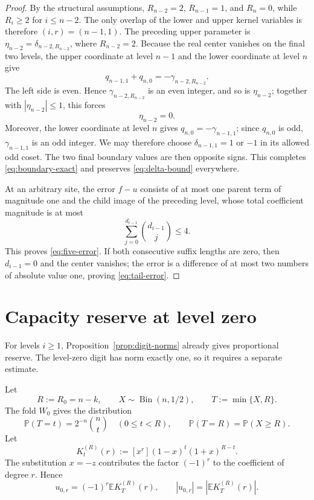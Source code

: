 \documentclass[11pt]{article}
\theoremstyle{definition}
\theoremstyle{remark}
\begin{document}
\begin{proof}
By the structural assumptions, $R_{n-2}=2$, $R_{n-1}=1$, and $R_n=0$,
while $R_i\ge2$ for $i\le n-2$. The only overlap of the
lower and upper kernel variables is therefore $(i,r)=(n-1,1)$.  The
preceding upper parameter is $\eta_{n-2}=\delta_{n-2,R_{n-2}}$, where
$R_{n-2}=2$.  Because the real center vanishes on the final two levels,
the upper coordinate at level $n-1$ and the lower coordinate at level $n$
give
\[
 q_{n-1,1}+q_{n,0}=-\gamma_{n-2,R_{n-2}}.
\]
The left side is even.  Hence $\gamma_{n-2,R_{n-2}}$ is an even integer, and so is $\eta_{n-2}$; together with $|\eta_{n-2}|\le1$, this forces
\[
 \eta_{n-2}=0.
\]
Moreover, the lower coordinate at level $n$ gives
$q_{n,0}=-\gamma_{n-1,1}$; since $q_{n,0}$ is odd,
$\gamma_{n-1,1}$ is an odd integer.  We may therefore choose
$\delta_{n-1,1}=1$ or $-1$ in its allowed odd coset.  The two final
boundary values are then opposite signs.  This completes
\eqref{eq:boundary-exact} and preserves \eqref{eq:delta-bound}
everywhere.

At an arbitrary site, the error $f-u$ consists of at most one parent term of magnitude one and the child image of the preceding level, whose total coefficient magnitude is at most
\[
 \sum_{j=0}^{d_{i-1}}\binom{d_{i-1}}j\le4.
\]
This proves \eqref{eq:five-error}.  If both consecutive suffix lengths are zero, then $d_{i-1}=0$ and the center vanishes; the error is a difference of at most two numbers of absolute value one, proving \eqref{eq:tail-error}.
\end{proof}

\section{Capacity reserve at level zero}

For levels $i\ge1$, Proposition~\ref{prop:digit-norms} already gives proportional reserve.  The level-zero digit has norm exactly one, so it requires a separate estimate.

Let
\[
 R:=R_0=n-k,
 \qquad
 X\sim\operatorname{Bin}(n,1/2),
 \qquad
 T:=\min\{X,R\}.
\]
The fold $W_0$ gives the distribution
\[
 \mathbb P(T=t)=2^{-n}\binom nt\quad(0\le t<R),
 \qquad
 \mathbb P(T=R)=\mathbb P(X\ge R).
\]
Let
\begin{equation}\label{eq:krawtchouk}
 K_t^{(R)}(r):=[x^r](1-x)^t(1+x)^{R-t}.
\end{equation}
The substitution $x=-z$ contributes the factor $(-1)^r$ to the
coefficient of degree $r$.  Hence
\begin{equation}\label{eq:u0-kraw}
 u_{0,r}=(-1)^r\mathbb E K_T^{(R)}(r),
 \qquad
 |u_{0,r}|=\left|\mathbb E K_T^{(R)}(r)\right|.
\end{equation}
\end{document}
